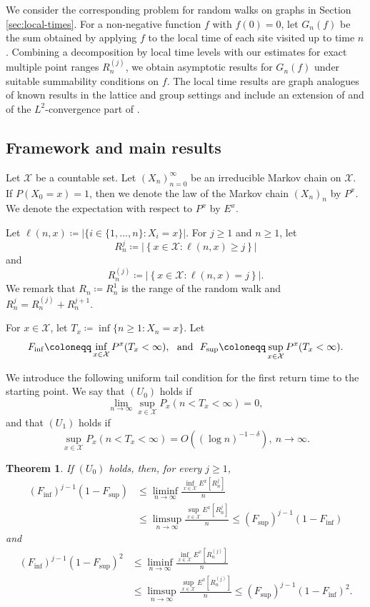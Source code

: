 \documentclass[a4paper, reqno, 11pt]{amsart}
\newtheorem{Thm}{Theorem}[section]
\theoremstyle{definition}
\begin{document}
We consider the corresponding problem for random walks on graphs in  Section \ref{sec:local-times}. 
For a non-negative function $f$ with $f(0)=0$, let $G_n(f)$ be the sum obtained by applying  $f$ to the local time of each site visited up to time $n$.
Combining a decomposition by local time levels with our estimates for exact multiple point ranges $R_n^{(j)}$, we obtain asymptotic results for $G_n(f)$ under suitable summability conditions on $f$. 
The local time results are graph analogues of known results in the lattice and group settings and  include an extension of \cite[Theorem 2]{CCMP2026} and of the $L^2$-convergence part of \cite[Theorem 1]{AK2020}.

\subsection{Framework and main results}

Let $\mathcal{X}$ be a countable set. 
Let $(X_n)_{n=0}^{\infty}$ be an irreducible Markov chain on $\mathcal{X}$. 
If $P(X_0 = x) = 1$, then we denote the law of the Markov chain $(X_n)_n$ by $P^x$. 
We denote the expectation with respect to $P^x$ by $E^x$. 

Let $\ell(n,x) \coloneqq |\{i \in \{1,\dots,n\} : X_i = x \}|$. 
For $j \ge 1$ and $n \ge 1$, let 
\[ R_n^{j} \coloneqq \left|\left\{x \in \mathcal{X} : \ell(n,x) \ge  j\right\}\right| \]
and 
\[ R_n^{(j)} \coloneqq \left|\left\{x \in \mathcal{X} : \ell(n,x) =  j\right\}\right|. \]
We remark that $R_n \coloneqq R_n^1$ is the range of the random walk and $R_{n}^{j} = R_{n}^{(j)} + R_n^{j+1}$. 

For $x \in \mathcal{X}$, let 
$T_{x} \coloneqq \inf\{n \ge 1 : X_n = x \}$. 
Let 
\[ F_{\inf} \coloneqq \inf_{x \in \mathcal{X}} P^x (T_x < \infty), \ \textup{ and } \   F_{\sup} \coloneqq \sup_{x \in \mathcal{X}} P^x (T_x < \infty).  \]

We introduce the following uniform tail condition for the first return time to the starting point. 
We say that $(U_0)$ holds if 
\[ \lim_{n \to \infty} \sup_{x \in \mathcal{X}} P_x (n < T_x < \infty) = 0, \]
and that $(U_1)$ holds if 
\[  \sup_{x \in \mathcal{X}} P_x (n < T_x < \infty) = O\left((\log n)^{-1-\delta} \right), \ n \to \infty. \]


\begin{Thm}\label{thm:main-exp}
If $(U_0)$ holds, then, for every $j \ge 1$, 
\begin{align*} 
(F_{\inf})^{j-1} (1-F_{\sup}) &\le  \liminf_{n \to \infty} \frac{\inf_{x \in \mathcal{X}} E^{x} \left[R_n^j \right]}{n} \\
&\le \limsup_{n \to \infty} \frac{\sup_{x \in \mathcal{X}} E^{x} \left[R_n^j \right]}{n}  \le (F_{\sup})^{j-1} (1-F_{\inf}) 
\end{align*}
and 
\begin{align*}  
(F_{\inf})^{j-1} (1-F_{\sup})^2 &\le  \liminf_{n \to \infty} \frac{\inf_{x \in \mathcal{X}} E^{x} \left[R_n^{(j)} \right]}{n} \\
&\le \limsup_{n \to \infty} \frac{\sup_{x \in \mathcal{X}} E^{x} \left[R_n^{(j)} \right]}{n}  \le (F_{\sup})^{j-1} (1-F_{\inf})^2. 
\end{align*}
\end{Thm}
\end{document}
